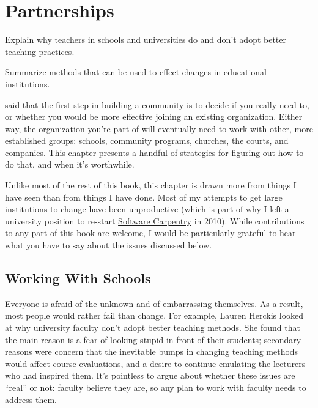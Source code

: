 \chapter{Partnerships}\label{s:partner}

\begin{objectives}

\item Explain why teachers in schools and universities do and don't
  adopt better teaching practices.

\item Summarize methods that can be used to effect changes in
  educational institutions.

\end{objectives}

 said that the first step in
building a community is to decide if you really need to, or whether
you would be more effective joining an existing organization.  Either
way, the organization you're part of will eventually need to work with
other, more established groups: schools, community programs, churches,
the courts, and companies.  This chapter presents a handful of
strategies for figuring out how to do that, and when it's worthwhile.

Unlike most of the rest of this book, this chapter is drawn more from
things I have seen than from things I have done.  Most of my attempts
to get large institutions to change have been unproductive (which is
part of why I left a university position to re-start
\href{http://carpentries.org}{Software Carpentry} in 2010).  While
contributions to any part of this book are welcome, I would be
particularly grateful to hear what you have to say about the issues
discussed below.

\section{Working With Schools}\label{s:partner-schools}

Everyone is afraid of the unknown and of embarrassing themselves. As a
result, most people would rather fail than change.  For example,
Lauren Herckis looked at
\href{https://www.insidehighered.com/news/2017/07/06/anthropologist-studies-why-professors-dont-adopt-innovative-teaching-methods}{why
  university faculty don't adopt better teaching methods}. She found
that the main reason is a fear of looking stupid in front of their
students; secondary reasons were concern that the inevitable bumps in
changing teaching methods would affect course evaluations, and a
desire to continue emulating the lecturers who had inspired them. It's
pointless to argue about whether these issues are ``real'' or not:
faculty believe they are, so any plan to work with faculty needs to
address them.

